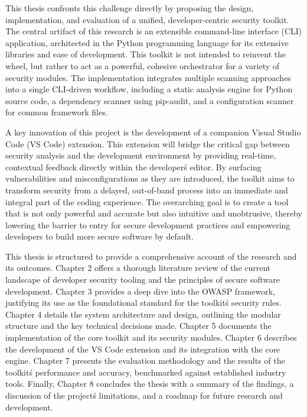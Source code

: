 This thesis confronts this challenge directly by proposing the design, implementation, and evaluation of a unified, developer-centric security toolkit. The central artifact of this research is an extensible command-line interface (CLI) application, architected in the Python programming language for its extensive libraries and ease of development. This toolkit is not intended to reinvent the wheel, but rather to act as a powerful, cohesive orchestrator for a variety of security modules. The implementation integrates multiple scanning approaches into a single CLI-driven workflow, including a static analysis engine for Python source code, a dependency scanner using pip-audit, and a configuration scanner for common framework files.

A key innovation of this project is the development of a companion Visual Studio Code (VS Code) extension. This extension will bridge the critical gap between security analysis and the development environment by providing real-time, contextual feedback directly within the developer\'s editor. By surfacing vulnerabilities and misconfigurations as they are introduced, the toolkit aims to transform security from a delayed, out-of-band process into an immediate and integral part of the coding experience. The overarching goal is to create a tool that is not only powerful and accurate but also intuitive and unobtrusive, thereby lowering the barrier to entry for secure development practices and empowering developers to build more secure software by default.

This thesis is structured to provide a comprehensive account of the research and its outcomes. Chapter 2 offers a thorough literature review of the current landscape of developer security tooling and the principles of secure software development. Chapter 3 provides a deep dive into the OWASP framework, justifying its use as the foundational standard for the toolkit\'s security rules. Chapter 4 details the system architecture and design, outlining the modular structure and the key technical decisions made. Chapter 5 documents the implementation of the core toolkit and its security modules. Chapter 6 describes the development of the VS Code extension and its integration with the core engine. Chapter 7 presents the evaluation methodology and the results of the toolkit\'s performance and accuracy, benchmarked against established industry tools. Finally, Chapter 8 concludes the thesis with a summary of the findings, a discussion of the project\'s limitations, and a roadmap for future research and development.
